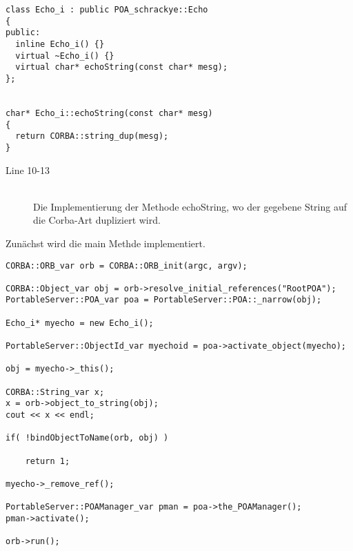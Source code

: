 \documentclass[11pt]{article}
\begin{document}
\begin{lstlisting}
class Echo_i : public POA_schrackye::Echo
{
public:
  inline Echo_i() {}
  virtual ~Echo_i() {}
  virtual char* echoString(const char* mesg);
};


char* Echo_i::echoString(const char* mesg)
{
  return CORBA::string_dup(mesg);
}
\end{lstlisting}

\begin{description}

\item[Line 10-13] \hfill \\
Die Implementierung der Methode echoString, wo der gegebene String auf die Corba-Art dupliziert wird.

\end{description}

Zunächst wird die main Methde implementiert.

\begin{lstlisting}
CORBA::ORB_var orb = CORBA::ORB_init(argc, argv);

CORBA::Object_var obj = orb->resolve_initial_references("RootPOA");
PortableServer::POA_var poa = PortableServer::POA::_narrow(obj);

Echo_i* myecho = new Echo_i();

PortableServer::ObjectId_var myechoid = poa->activate_object(myecho);

obj = myecho->_this();

CORBA::String_var x;
x = orb->object_to_string(obj);
cout << x << endl;

if( !bindObjectToName(orb, obj) )

	return 1;

myecho->_remove_ref();

PortableServer::POAManager_var pman = poa->the_POAManager();
pman->activate();

orb->run();
\end{lstlisting}
\end{document}
